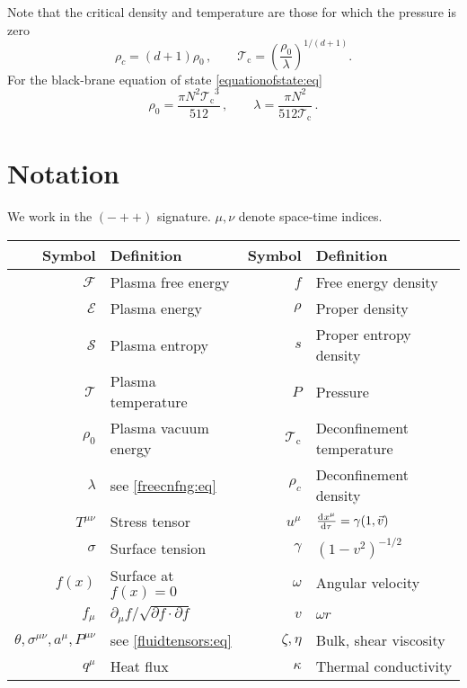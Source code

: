 \documentclass[12pt,a4paper]{article}
\newcommand{\cdt}{\!\cdot\!}
\newcommand{\vp}{\vspace{0.5cm}}
\newcommand{\prn}[1]{\left ( #1 \right )}
\newcommand{\diff}[3][\rule{0mm}{0mm}]{\frac{\mathrm{d}^{#1} #2}{\mathrm{d}{#3}^{#1}}}
\newcommand{\p}{\partial}
\newcommand{\rz}{\rho_0}
\newcommand{\tc}{\mathcal{T_\mathrm{c}}}
\newcommand{\tloc}{\mathcal{T}}
\newcommand{\floc}{\mathcal{F}}
\newcommand{\eloc}{\mathcal{E}}
\newcommand{\sloc}{\mathcal{S}}
\begin{document}
Note that the critical density and temperature are those for which
the pressure is zero
%
\begin{equation}\label{crittherm:eq}
    \rho_c = (d+1)\rz\,, \qquad
    \tc = \prn{\frac{\rz}{\lambda}}^{1/(d+1)}.
\end{equation}
%
For the black-brane equation of state \eqref{equationofstate:eq}
%
\begin{equation}\label{braneparam:eq}
  \rz = \frac{\pi N^2 \tc^3}{512}\,,
  \qquad
  \lambda = \frac{\pi N^2}{512 \tc}\,.
\end{equation}
%










\section{Notation}\label{app:notation}

We work in the $(-++)$ signature. $\mu,\nu$ denote space-time
indices.

\vp
  \centering
  \begin{tabular}{||r|l||r|l||}
    \hline
    Symbol & Definition & Symbol & Definition \\
    \hline
    $\floc$ & Plasma free energy & $f$ & Free energy density \\
    $\eloc$ & Plasma energy & $\rho$ & Proper density \\
    $\sloc$ & Plasma entropy & $s$ & Proper entropy density \\
    $\tloc$ & Plasma temperature & $P$ & Pressure \\
    $\rz$ & Plasma vacuum energy & $\tc$ & Deconfinement temperature \\
    $\lambda$ & see \eqref{freecnfng:eq} & $\rho_c$ & Deconfinement density \\
    \hline
%
    $T^{\mu\nu}$ & Stress tensor & $u^\mu$ & $\diff{x^\mu}{\tau}=\gamma(1,\vec{v})$ \\
    $\sigma$ & Surface tension & $\gamma$ & $\prn{1-v^2}^{-1/2}$ \\
    $f(x)$ & Surface at $f(x)=0$ & $\omega$ & Angular velocity \\
    $f_\mu$ & $\p_\mu f / \sqrt{\p f \cdt \p f}$ & $v$ & $\omega r$ \\
    $\theta,\sigma^{\mu\nu},a^\mu,P^{\mu\nu}$ & see \eqref{fluidtensors:eq}
       & $\zeta,\eta$ & Bulk, shear viscosity \\
    $q^\mu$ & Heat flux & $\kappa$ & Thermal conductivity \\
    \hline
  \end{tabular}
\end{document}
